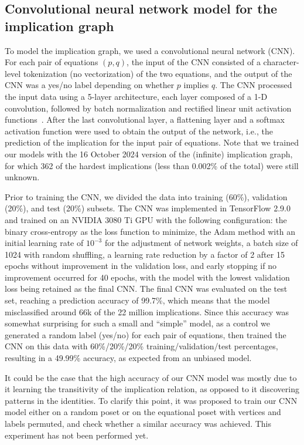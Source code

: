 \documentclass[12pt]{amsart}
\theoremstyle{definition}
\begin{document}
\subsection*{Convolutional neural network model for the implication graph}

To model the implication graph, we used a convolutional neural network (CNN)\@. For each pair of equations $(p,q)$, the input of the CNN consisted of a character-level tokenization (no vectorization) of the two equations, and the output of the CNN was a yes/no label depending on whether $p$ implies $q$. The CNN processed the input data using a 5-layer architecture, each layer composed of a 1-D convolution, followed by batch normalization and rectified linear unit activation functions~\cite{Goodfellow-et-al-2016}. After the last convolutional layer, a flattening layer and a softmax activation function were used to obtain the output of the network, i.e.\@, the prediction of the implication for the input pair of equations. Note that we trained our models with the 16 October 2024 version of the (infinite) implication graph, for which 362 of the hardest implications (less than 0.002\% of the total) were still unknown.

\smallskip

Prior to training the CNN, we divided the data into training (60\%), validation (20\%), and test (20\%) subsets. The CNN was implemented in TensorFlow 2.9.0~\cite{tensorflow2015-whitepaper} and trained on an NVIDIA 3080 Ti GPU with the following configuration: the binary cross-entropy as the loss function to minimize, the Adam method with an initial learning rate of $10^{-3}$ for the adjustment of network weights, a batch size of 1024 with random shuffling, a learning rate reduction by a factor of 2 after 15 epochs without improvement in the validation loss, and early stopping if no improvement occurred for 40 epochs, with the model with the lowest validation loss being retained as the final CNN\@.
The final CNN was evaluated on the test set, reaching a prediction accuracy of 99.7\%, which means that the model misclassified around 66k of the 22 million implications. Since this accuracy was somewhat surprising for such a small and “simple” model, as a control we generated a random label (yes/no) for each pair of equations, then trained the CNN on this data with 60\%/20\%/20\% training/validation/test percentages, resulting in a 49.99\% accuracy, as expected from an unbiased model.

\smallskip

It could be the case that the high accuracy of our CNN model was mostly due to it learning the transitivity of the implication relation, as opposed to it discovering patterns in the identities. To clarify this point, it was proposed to train our CNN model either on a random poset or on the equational poset with vertices and labels permuted, and check whether a similar accuracy was achieved. This experiment has not been performed yet.
\end{document}
